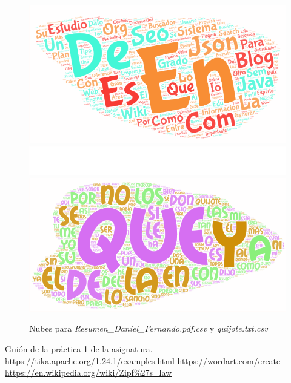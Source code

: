 \documentclass[12pt]{article}
\begin{document}
\begin{figure}[h]
\centering
\includegraphics[scale=0.67]{nube1.png}
\includegraphics[scale=0.55]{blanc.png}
\includegraphics[scale=0.67]{nube2.png}
\caption{Nubes para \textit{Resumen\_Daniel\_Fernando.pdf.csv} y \textit{quijote.txt.csv}}
\label{nubes}
\end{figure}

\clearpage

\patchcmd{\thebibliography}{\section*}{\section}{}{}
\begin{thebibliography}{}
 Guión de la práctica 1 de la asignatura.
 \url{https://tika.apache.org/1.24.1/examples.html}
 \url{https://wordart.com/create}
 \url{https://en.wikipedia.org/wiki/Zipf%27s_law}
\end{thebibliography}
\end{document}

